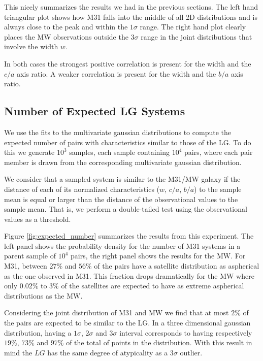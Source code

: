 \documentclass[a4paper,fleqn,usenatbib]{mnras}
\begin{document}
This nicely summarizes the results we had in the previous
sections. The left hand triangular plot shows how M31 falls into the middle of all 2D
distributions and is always close to the peak and within the $1\sigma$
range. 
The right hand plot clearly places the MW observations outside the
$3\sigma$ range in the joint distributions that involve the width
$w$. 

In both cases the strongest positive correlation is present for the
width and the $c/a$ axis ratio. A weaker correlation is present for
the width and the $b/a$ axis ratio. 



\subsection{Number of Expected LG Systems}

We use the fits to the multivariate gaussian distributions to
compute the expected number of pairs with characteristics similar to
those of the LG.
To do this we generate $10^3$ samples, each sample containing $10^4$
pairs, where each pair member is drawn from the corresponding
multivariate gaussian distribution.  

We consider that a sampled system is similar to the M31/MW galaxy if the
distance of each of its normalized characteristics ($w$, $c/a$, $b/a$) to the
sample mean is equal or larger than the distance of the observational
values to the sample mean.   
That is, we perform a double-tailed test using the observational
values as a threshold. 

Figure \ref{fig:expected_number} summarizes the results from this
experiment. The left panel shows the probability density for the number of M31
systems in a parent sample of $10^4$ pairs, the right panel shows the
results for the MW.
For M31, between $27\%$ and $56\%$ of the pairs have a satellite
distribution as aspherical as the one observed in M31. This fraction drops
dramatically for the MW where only $0.02\%$ to $3\%$ of the satellites
are expected to have as extreme aspherical distributions as the MW.

Considering the joint distribution of M31 and MW we find that at most
$2\%$ of the pairs are expected to be similar to the LG.
In a three dimensional gaussian distribution, having a $1\sigma$,
$2\sigma$ and $3\sigma$ interval corresponds to having respectively $19 \%$, $73 \%$ and
$97 \%$ of the total of points in the distribution.
With this result in mind the $LG$ has the same degree of atypicality
as a $3\sigma$ outlier. 
\end{document}
